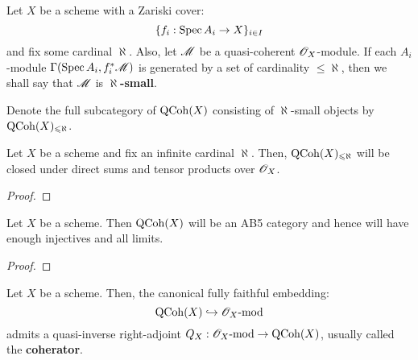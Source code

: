             \begin{definition} \label{def: small_quasi_coherent_modules}
                Let $X$ be a scheme with a Zariski cover:
                    $$\{f_i: \operatorname{Spec} A_i \to X\}_{i \in I}$$
                and fix some cardinal $\aleph$. Also, let $\mathscr{M}$ be a quasi-coherent $\mathscr{O}_X$-module. If each $A_i$-module $\Gamma(\operatorname{Spec} A_i, f_i^*\mathscr{M})$ is generated by a set of cardinality $\leq \aleph$, then we shall say that $\mathscr{M}$ is \textbf{$\aleph$-small}. 

                Denote the full subcategory of $\mathrm{QCoh}(X)$ consisting of $\aleph$-small objects by $\mathrm{QCoh}(X)_{\leqslant \aleph}$.
            \end{definition}
            \begin{lemma} \label{lemma: closure_properties_of_small_quasi_coherent_modules}
                Let $X$ be a scheme and fix an infinite cardinal $\aleph$. Then, $\mathrm{QCoh}(X)_{\leqslant \aleph}$ will be closed under direct sums and tensor products over $\mathscr{O}_X$.
            \end{lemma}
                \begin{proof}
                    
                \end{proof}
            \begin{theorem} \label{theorem: qcoh_homological_properties}
                Let $X$ be a scheme. Then $\mathrm{QCoh}(X)$ will be an AB5 category and hence will have enough injectives and all limits. 
            \end{theorem}
                \begin{proof}
                    
                \end{proof}
            \begin{corollary}
                Let $X$ be a scheme. Then, the canonical fully faithful embedding:
                    $$\mathrm{QCoh}(X) \hookrightarrow \mathscr{O}_X\text{-}\mathrm{mod}$$
                admits a quasi-inverse right-adjoint $Q_X: \mathscr{O}_X\text{-}\mathrm{mod} \to \mathrm{QCoh}(X)$, usually called the \textbf{coherator}.
            \end{corollary}
            
